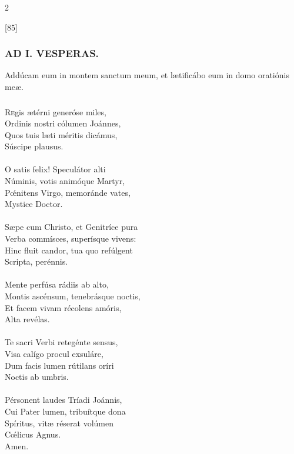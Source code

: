 \documentclass[9pt,twoside]{extarticle}
\begin{document}
\begin{multicols}{2}
\begin{tightlist}{}
\item {} [85] 
\end{tightlist}
\subsubsection*{\center \textsc{AD I. VESPERAS.}}
\begin{tightlist}{}
\item {}
\item {} Addúcam eum in montem sanctum meum, et lætificábo eum in domo oratiónis meæ. 
\end{tightlist}

\subsubsection*{\center{}}
\lettrine{R}egis ætérni generóse miles,\\ Ordinis nostri cólumen Joánnes,\\ Quos tuis læti méritis dicámus,\\ Súscipe plausus.\\
\\ 
O satis felix! Speculátor alti\\ Núminis, votis animóque Martyr,\\ Pœ́nitens Virgo, memoránde vates,\\ Mystice Doctor.\\
\\
Sæpe cum Christo, et Genitríce pura\\ Verba commísces, superísque vivens:\\ Hinc fluit candor, tua quo refúlgent\\ Scripta, perénnis.\\
\\
Mente perfúsa rádiis ab alto,\\ Montis ascénsum, tenebrásque noctis,\\ Et facem vivam récolens amóris,\\ Alta revélas.\\
\\
Te sacri Verbi retegénte sensus,\\ Visa calígo procul exsuláre,\\ Dum facis lumen rútilans oríri\\ Noctis ab umbris.\\
\\
Pérsonent laudes Tríadi Joánnis,\\ Cui Pater lumen, tribuítque dona\\ Spíritus, vitæ réserat volúmen\\ Cœ́licus Agnus.\\
Amen.


\end{multicols}
\end{document}
